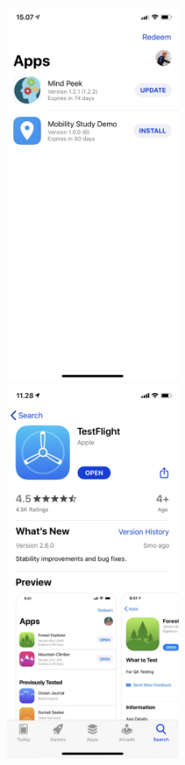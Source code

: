 \begin{figure}
    \centering
    \includegraphics[width=0.5\textwidth]{images/app_imgs/app_testflight.png}
    \includegraphics[width=0.5\textwidth]{images/app_imgs/app-appstore.png}

\end{figure}

